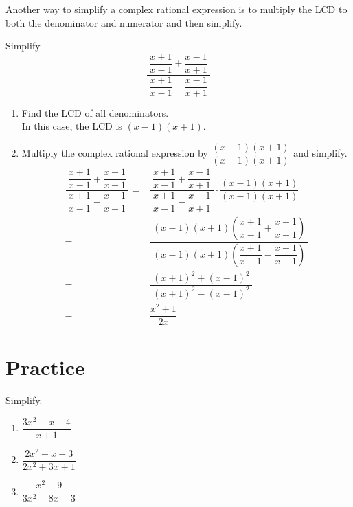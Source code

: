 \documentclass[en,12pt]{elegantbook}
\providecommand{\tightlist}{%
  \setlength{\itemsep}{0pt}\setlength{\parskip}{0pt}}
\newenvironment{rmdnote}{
    \par\noindent
    \makebox[-\width][r]{
    \tiny\color{red!90}
    \textdbend
    \hspace*{2pt}
    }
    \makebox[\width][l]{
        \hspace*{3pt}
        \textbf{
            \color{second}
            Note 
        }
    }
    \begin{shaded}
    \itshape
}{
    \par
    \end{shaded}
}
\providecommand{\tightlist}{%
  \setlength{\itemsep}{0pt}\setlength{\parskip}{0pt}}
\let\BeginKnitrBlock\begin \let\EndKnitrBlock\end
\begin{document}
\begin{rmdnote}

Another way to simplify a complex rational expression is to multiply the LCD to both the denominator and numerator and then simplify.

\end{rmdnote}

\BeginKnitrBlock{example}
\protect\hypertarget{exm:unnamed-chunk-52}{}{\label{exm:unnamed-chunk-52} }
Simplify
\[\dfrac{~\dfrac{x+1}{x-1}+\dfrac{x-1}{x+1}~}{~\dfrac{x+1}{x-1}-\dfrac{x-1}{x+1}~}\]
\EndKnitrBlock{example}

\BeginKnitrBlock{solution}


\begin{enumerate}
\def\labelenumi{\arabic{enumi}.}
\tightlist
\item
  Find the LCD of all denominators.\\
  In this case, the LCD is \((x-1)(x+1)\).
\item
  Multiply the complex rational expression by \(\dfrac{(x-1)(x+1)}{(x-1)(x+1)}\) and simplify.
  \[
  \begin{aligned}
   \dfrac{~\dfrac{x+1}{x-1}+\dfrac{x-1}{x+1}~}{~\dfrac{x+1}{x-1}-\dfrac{x-1}{x+1}~}
   =&\dfrac{~\dfrac{x+1}{x-1}+\dfrac{x-1}{x+1}~}{~\dfrac{x+1}{x-1}-\dfrac{x-1}{x+1}~}\cdot \dfrac{(x-1)(x+1)}{(x-1)(x+1)}\\[5pt]
   =& \dfrac{~(x-1)(x+1)\left(\dfrac{x+1}{x-1}+\dfrac{x-1}{x+1}\right)~}{~(x-1)(x+1)\left(\dfrac{x+1}{x-1}-\dfrac{x-1}{x+1}\right)~}\\[5pt]
   =& \dfrac{~(x+1)^2+(x-1)^2~}{~(x+1)^2-(x-1)^2~}\\[5pt]
   =& \dfrac{x^2+1}{2x}
  \end{aligned}
  \]
\end{enumerate}
\EndKnitrBlock{solution}

\hypertarget{practice-2}{%
\section{Practice}\label{practice-2}}

\BeginKnitrBlock{exercise}
\protect\hypertarget{exr:unnamed-chunk-54}{}{\label{exr:unnamed-chunk-54} }
Simplify.

\begin{enumerate}
\def\labelenumi{\arabic{enumi}.}
\item
  \(\dfrac{3x^2-x-4}{x+1}\)
\item
  \(\dfrac{2x^2-x-3}{2x^2+3x+1}\)
\item
  \(\dfrac{x^2-9}{3x^2-8x-3}\)
\end{enumerate}
\EndKnitrBlock{exercise}
\end{document}
